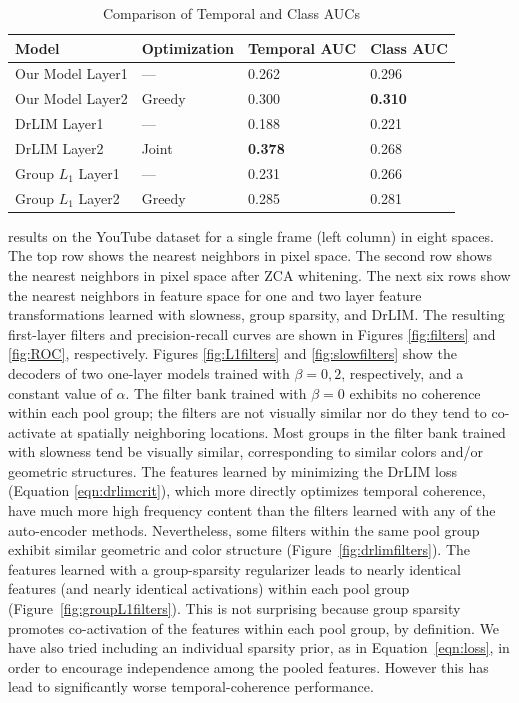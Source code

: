 \begin{table} \centering \begin{tabular}{| l | l | l | l |} \hline Model &
Optimization & Temporal AUC & Class AUC \\ \hline Our Model Layer1 & --- &
0.262 & 0.296 \\ Our Model Layer2 & Greedy & 0.300 & \bf{0.310} \\ DrLIM Layer1
& --- & 0.188 & 0.221 \\ DrLIM Layer2 & Joint & \bf{0.378} & 0.268 \\ Group
$L_1$ Layer1 & --- & 0.231 & 0.266 \\ Group $L_1$ Layer2 & Greedy & 0.285 &
0.281 \\ \hline \end{tabular} \caption{Comparison of Temporal and Class AUCs} \end{table} %
results on the YouTube dataset for a single frame (left column) in eight
spaces. The top row shows the nearest neighbors in pixel space. The second row
shows the nearest neighbors in pixel space after ZCA whitening. The next six
rows show the nearest neighbors in feature space for one and two layer feature
transformations learned with slowness, group sparsity, and DrLIM. The resulting
first-layer filters and precision-recall curves are shown in Figures
\ref{fig:filters} and \ref{fig:ROC}, respectively.   Figures
\ref{fig:L1filters} and \ref{fig:slowfilters} show the decoders of two
one-layer models trained with $\beta = 0,2$, respectively, and a constant value
of $\alpha$. The filter bank trained with $\beta = 0$ exhibits no coherence
within each pool group; the filters are not visually similar nor do they tend
to co-activate at spatially neighboring locations. Most groups in the filter
bank trained with slowness tend be visually similar, corresponding to similar
colors and/or geometric structures. The features learned by minimizing the
DrLIM loss (Equation \ref{eqn:drlimcrit}), which more directly optimizes
temporal coherence, have much more high frequency content than the filters
learned with any of the auto-encoder methods. Nevertheless, some filters within
the same pool group exhibit similar geometric and color structure
(Figure~\ref{fig:drlimfilters}). The features learned with a group-sparsity
regularizer leads to nearly identical features (and nearly identical
activations) within each pool group (Figure~\ref{fig:groupL1filters}). This is
not surprising because group sparsity promotes co-activation of the features
within each pool group, by definition. We have also tried including an
individual sparsity prior, as in Equation~\ref{eqn:loss}, in order to encourage
independence among the pooled features. However this has lead to significantly
worse temporal-coherence performance.  %

